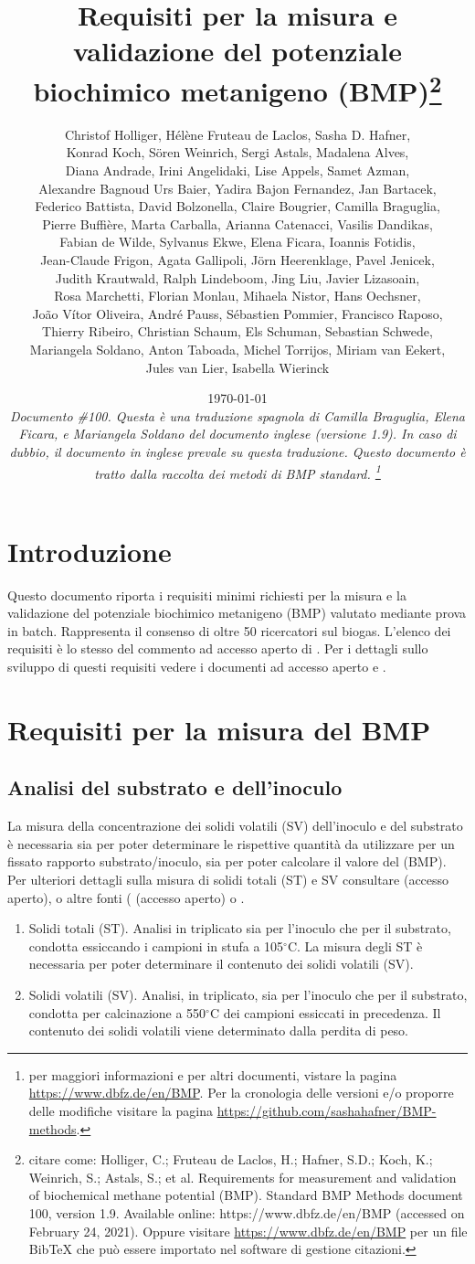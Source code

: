 \documentclass[]{article}
\title {Requisiti per la misura e validazione del potenziale biochimico metanigeno (BMP)\footnote{
  citare come: 
Holliger, C.; Fruteau de Laclos, H.; Hafner, S.D.; Koch, K.; Weinrich, S.; Astals, S.; et al. Requirements for measurement and validation of biochemical methane potential (BMP). Standard BMP Methods document 100, version 1.9. Available online: https://www.dbfz.de/en/BMP (accessed on February 24, 2021).
\newline
  Oppure visitare \url{https://www.dbfz.de/en/BMP} per un file BibTeX che può essere importato nel software di gestione citazioni.
}}
\author{
Christof Holliger, 
H{\'e}l{\`e}ne Fruteau de Laclos,
Sasha D. Hafner,\\
Konrad Koch,
S{\"o}ren Weinrich,
Sergi Astals, 
Madalena Alves, \\ 
Diana Andrade,
Irini Angelidaki,
Lise Appels, 
Samet Azman, \\
Alexandre Bagnoud
Urs Baier,
Yadira Bajon Fernandez,
Jan Bartacek,\\
Federico Battista,
David Bolzonella,
Claire Bougrier,
Camilla Braguglia, \\
Pierre Buffi{\`e}re,
Marta Carballa,
Arianna Catenacci,
Vasilis Dandikas, \\
Fabian de Wilde,
Sylvanus Ekwe,
Elena Ficara,
Ioannis Fotidis,\\
Jean-Claude Frigon,
Agata Gallipoli,
J{\"o}rn Heerenklage,
Pavel Jenicek,\\
Judith Krautwald,
Ralph Lindeboom,
Jing Liu,
Javier Lizasoain, \\
Rosa Marchetti,
Florian Monlau,
Mihaela Nistor,
Hans Oechsner,\\
Jo{\~a}o V{\'i}tor Oliveira,
Andr{\'e} Pauss,
S{\'e}bastien Pommier,
Francisco Raposo, \\
Thierry Ribeiro,
Christian Schaum,
Els Schuman,
Sebastian Schwede, \\
Mariangela Soldano,
Anton Taboada,
Michel Torrijos,
Miriam van Eekert,\\
Jules van Lier, 
Isabella Wierinck
}
\date{\today \\
\bigskip
\textit{
  Documento \#100.
  Questa è una traduzione spagnola di Camilla Braguglia, Elena Ficara, e Mariangela Soldano del documento inglese (versione 1.9). In caso di dubbio, il documento in inglese prevale su questa traduzione.  
  Questo documento è tratto dalla raccolta dei metodi di BMP standard.
    \footnote{per maggiori informazioni e per altri documenti, vistare la pagina \url{https://www.dbfz.de/en/BMP}. 
    Per la cronologia delle versioni e/o proporre delle modifiche visitare la pagina \url{https://github.com/sashahafner/BMP-methods}.}
}
}
\begin{document}
\maketitle

\section{Introduzione}
Questo documento riporta i requisiti minimi richiesti per la misura e la validazione del potenziale biochimico metanigeno (BMP) valutato mediante prova in batch.
Rappresenta il consenso di oltre 50 ricercatori sul biogas.
L'elenco dei requisiti è lo stesso del commento ad accesso aperto di \citet{holligerStandardizationBiomethanePotential2021}.
Per i dettagli sullo sviluppo di questi requisiti vedere i documenti ad accesso aperto \citet{holligerStandardizationBiomethanePotential2016} e \citet{hafnerImprovingInterlaboratoryReproducibility2020}. 

\section{Requisiti per la misura del BMP}
\label{sec:requirements}
\subsection{Analisi del substrato e dell’inoculo}
\label{sec:analysis}
La misura della concentrazione dei solidi volatili (SV) dell’inoculo e del substrato è necessaria sia per poter determinare le rispettive quantità da utilizzare per un fissato rapporto substrato/inoculo, sia per poter calcolare il valore del (BMP).
   Per ulteriori dettagli sulla misura di solidi totali (ST) e SV consultare \citet{epaMethod1684Total2001} (accesso aperto), o altre fonti (\citet{strachDeterminationTotalSolids2020} (accesso aperto) o \citet{bairdStandardMethodsExamination2017}. 
  \begin{enumerate}
    \item Solidi totali (ST). Analisi in triplicato sia per l’inoculo che per il substrato, condotta essiccando i campioni in stufa a 105$^\circ$C. La misura degli ST è necessaria per poter determinare il contenuto dei solidi volatili (SV).
    \item Solidi volatili (SV). Analisi, in triplicato, sia per l’inoculo che per il substrato, condotta per calcinazione a 550$^\circ$C dei campioni essiccati in precedenza. Il contenuto dei solidi volatili viene determinato dalla perdita di peso.

  \end{enumerate}
\end{document}
